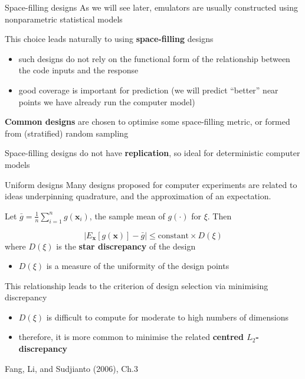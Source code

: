\documentclass[
  ignorenonframetext,
]{beamer}
\providecommand{\tightlist}{%
  \setlength{\itemsep}{0pt}\setlength{\parskip}{0pt}}
\begin{document}
\begin{frame}{Space-filling designs}
\protect\hypertarget{space-filling-designs}{}
As we will see later, emulators are usually constructed using
nonparametric statistical models

This choice leads naturally to using \textbf{space-filling} designs

\begin{itemize}
\tightlist
\item
  such designs do not rely on the functional form of the relationship
  between the code inputs and the response
\item
  good coverage is important for prediction (we will predict ``better''
  near points we have already run the computer model)
\end{itemize}

\textbf{Common designs} are chosen to optimise some space-filling
metric, or formed from (stratified) random sampling

Space-filling designs do not have \textbf{replication}, so ideal for
deterministic computer models
\end{frame}

\begin{frame}{Uniform designs}
\protect\hypertarget{uniform-designs}{}
Many designs proposed for computer experiments are related to ideas
underpinning quadrature, and the approximation of an expectation.

Let \(\bar{g} = \frac{1}{n}\sum_{i=1}^n g(\boldsymbol{x}_i)\), the
sample mean of \(g(\cdot)\) for \(\xi\). Then

\[
|E_\boldsymbol{x}[g(\boldsymbol{x})] - \bar{g}| \le \mbox{constant}\times D(\xi)
\] where \(D(\xi)\) is the \textbf{star discrepancy} of the design

\begin{itemize}
\tightlist
\item
  \(D(\xi)\) is a measure of the uniformity of the design points
\end{itemize}

This relationship leads to the criterion of design selection via
minimising discrepancy

\begin{itemize}
\tightlist
\item
  \(D(\xi)\) is difficult to compute for moderate to high numbers of
  dimensions
\item
  therefore, it is more common to minimise the related \textbf{centred
  \(L_2\)-discrepancy}
\end{itemize}

Fang, Li, and Sudjianto (2006), Ch.3
\end{frame}
\end{document}
